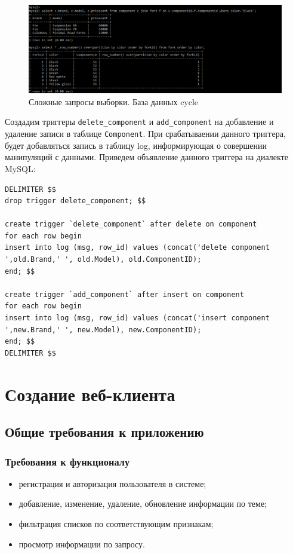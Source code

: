 \documentclass[a4paper,14pt]{extarticle}
\begin{document}
\begin{figure}[h!]
	\centering
	\includegraphics[width=0.7\linewidth]{images/join-window-cycle}
	\caption{Сложные запросы выборки. База данных cycle}
	\label{fig:join-window-cycle}
\end{figure}


Создадим триггеры \texttt{delete\_component} и  \texttt{add\_component} на добавление и удаление записи в таблице \texttt{Component}. При срабатываении данного триггера, будет добавляться запись в таблицу log, информирующая о совершении манипуляций с данными.
\newpage\hfill\newpage
Приведем объявление данного триггера на диалекте MySQL:
\lstset{
	language=sql
}
\begin{lstlisting}
DELIMITER $$
drop trigger delete_component; $$

create trigger `delete_component` after delete on component
for each row begin
insert into log (msg, row_id) values (concat('delete component ',old.Brand,' ', old.Model), old.ComponentID);
end; $$

create trigger `add_component` after insert on component
for each row begin
insert into log (msg, row_id) values (concat('insert component ',new.Brand,' ', new.Model), new.ComponentID);
end; $$
DELIMITER $$
\end{lstlisting}

\section{Создание веб-клиента}

\subsection{Общие требования к приложению}

\subsubsection*{Требования к функционалу}
\begin{itemize}
	\item регистрация и авторизация пользователя в системе;
	\item добавление, изменение, удаление, обновление информации по
	теме;
	\item фильтрация списков по соответствующим признакам;
	\item просмотр информации по запросу.
\end{itemize}
\end{document}
